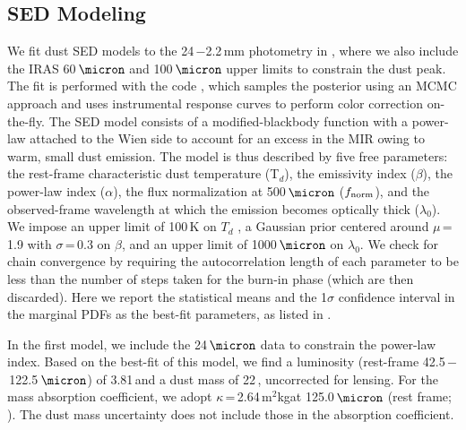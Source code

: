 \documentclass[]{emulateapj}
\begin{document}
\subsection{SED Modeling} \label{sec:SED}  %
We fit dust SED models to the
24\,\micron$-$2.2\,mm photometry in , where we also
include the IRAS 60\,$\micron$ and 100\,$\micron$ upper limits
to constrain the dust peak.
The fit is performed with the code
 \citep[\eg][]{Riechers13a,Dowell14a}, which samples the posterior
using an MCMC approach and uses instrumental
response curves to perform color correction on-the-fly.
The SED model consists of a modified-blackbody
function with a power-law attached to the
Wien side to account for an excess in the MIR owing to warm,
small dust emission.
%
The model is thus described by five free parameters: the rest-frame characteristic dust
temperature (T$_{d}$), the emissivity index ($\beta$), the power-law index
($\alpha$), the flux normalization at 500\,$\micron$ ($f_{\rm norm}$), and
the observed-frame wavelength at which the emission
becomes optically thick ($\lambda_{0}$). We impose
an upper limit of 100\,K on $T_d$ \citep[see \eg][]{Sajina12a}, 
a Gaussian prior centered around
$\mu$\,=\,1.9 with $\sigma$\,=\,0.3 on $\beta$, and an upper limit of
1000\,$\micron$ on $\lambda_0$.
We check for chain convergence by requiring the autocorrelation
length of each parameter to be less than the number of steps
taken for the burn-in phase (which are then discarded).
Here we report the statistical means %
and the 1$\sigma$ confidence interval in the marginal PDFs
as the best-fit parameters, as listed in .



In the first model, we include the 24\,$\micron$ data
to constrain the power-law index. Based on the
best-fit of this model, we find a
\fir luminosity (rest-frame 42.5\,$-$\,122.5\,$\micron$) of
3.81\,\Lsun and a
dust mass of 22\,\Msun, uncorrected for lensing.
For the mass absorption coefficient, we adopt
$\kappa$\,=\,2.64\,m$^2$kg\pmOne at 125.0\,$\micron$
(rest frame; \citealt{Dunne03a}).
The dust mass uncertainty does not
include those in the absorption coefficient.
\end{document}
